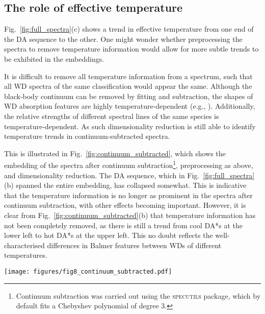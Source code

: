 \documentclass[fleqn,usenatbib]{mnras}
\def\Teff{T_\mathrm{eff}}
\begin{document}
\subsection{The role of effective temperature}
\label{sec:discteff}

Fig.~\ref{fig:full_spectra}(c) shows a trend in effective temperature from one end of the DA sequence to the other.
One might wonder whether preprocessing the spectra to remove temperature information would allow for more subtle trends to be exhibited in the embeddings.

It is difficult to remove all temperature information from a spectrum, such that all WD spectra of the same classification would appear the same.
Although the black-body continuum can be removed by fitting and subtraction, the shapes of WD absorption features are highly temperature-dependent (e.g., \citealt{liebert05, tremblay09}).
Additionally, the relative strengths of different spectral lines of the same species is temperature-dependent.
As such dimensionality reduction is still able to identify temperature trends in continuum-subtracted spectra.

This is illustrated in Fig.~\ref{fig:continuum_subtracted}, which shows the embedding of the spectra after continuum subtraction\footnote{
    Continuum subtraction was carried out using the \textsc{specutils} package, which by default fits a Chebyshev polynomial of degree 3.
}, preprocessing as above, and dimensionality reduction.
The DA sequence, which in Fig.~\ref{fig:full_spectra}(b) spanned the entire embedding, has collapsed somewhat.
This is indicative that the temperature information is no longer as prominent in the spectra after continuum subtraction, with other effects becoming important.
However, it is clear from Fig.~\ref{fig:continuum_subtracted}(b) that temperature information has not been completely removed, as there is still a trend from cool DA*s at the lower left to hot DA*s at the upper left.
This no doubt reflects the well-characterised differences in Balmer features between WDs of different temperatures.

\begin{figure*}
\texttt{[image: figures/fig8\_continuum\_subtracted.pdf]}
\caption{
    Dimensionality-reduced embedding of spectra following continuum subtraction.
    (a) Colour-coded according to the visual classification of \citet{manser24}, as in Fig.~\ref{fig:full_spectra}(b).
    The DA sequence has partially collapsed, but not entirely.
    (b) Colour-coded according to $\Teff$, as in Fig.~\ref{fig:full_spectra}(c).
    There is still a temperature trend along the shorter DA sequence.
}
\label{fig:continuum_subtracted}
\end{figure*}
\end{document}
